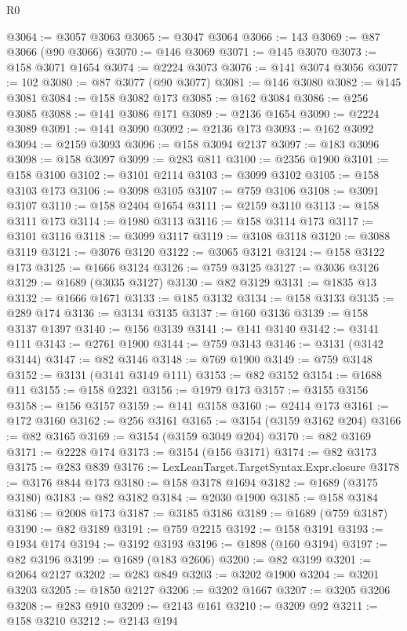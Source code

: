 \begin{lexlean}{R0}
\begin{coremodule}
@3064 := @3057 @3063
@3065 := @3047 @3064
@3066 := 143
@3069 := @87 @3066 (@90 @3066)
@3070 := @146 @3069
@3071 := @145 @3070
@3073 := @158 @3071 @1654
@3074 := @2224 @3073
@3076 := @141 @3074 @3056
@3077 := 102
@3080 := @87 @3077 (@90 @3077)
@3081 := @146 @3080
@3082 := @145 @3081
@3084 := @158 @3082 @173
@3085 := @162 @3084
@3086 := @256 @3085
@3088 := @141 @3086 @171
@3089 := @2136 @1654
@3090 := @2224 @3089
@3091 := @141 @3090
@3092 := @2136 @173
@3093 := @162 @3092
@3094 := @2159 @3093
@3096 := @158 @3094 @2137
@3097 := @183 @3096
@3098 := @158 @3097
@3099 := @283 @811
@3100 := @2356 @1900
@3101 := @158 @3100
@3102 := @3101 @2114
@3103 := @3099 @3102
@3105 := @158 @3103 @173
@3106 := @3098 @3105
@3107 := @759 @3106
@3108 := @3091 @3107
@3110 := @158 @2404 @1654
@3111 := @2159 @3110
@3113 := @158 @3111 @173
@3114 := @1980 @3113
@3116 := @158 @3114 @173
@3117 := @3101 @3116
@3118 := @3099 @3117
@3119 := @3108 @3118
@3120 := @3088 @3119
@3121 := @3076 @3120
@3122 := @3065 @3121
@3124 := @158 @3122 @173
@3125 := @1666 @3124
@3126 := @759 @3125
@3127 := @3036 @3126
@3129 := @1689 (@3035 @3127)
@3130 := @82 @3129
@3131 := @1835 @13
@3132 := @1666 @1671
@3133 := @185 @3132
@3134 := @158 @3133
@3135 := @289 @174
@3136 := @3134 @3135
@3137 := @160 @3136
@3139 := @158 @3137 @1397
@3140 := @156 @3139
@3141 := @141 @3140
@3142 := @3141 @111
@3143 := @2761 @1900
@3144 := @759 @3143
@3146 := @3131 (@3142 @3144)
@3147 := @82 @3146
@3148 := @769 @1900
@3149 := @759 @3148
@3152 := @3131 (@3141 @3149 @111)
@3153 := @82 @3152
@3154 := @1688 @11
@3155 := @158 @2321
@3156 := @1979 @173
@3157 := @3155 @3156
@3158 := @156 @3157
@3159 := @141 @3158
@3160 := @2414 @173
@3161 := @172 @3160
@3162 := @256 @3161
@3165 := @3154 (@3159 @3162 @204)
@3166 := @82 @3165
@3169 := @3154 (@3159 @3049 @204)
@3170 := @82 @3169
@3171 := @2228 @174
@3173 := @3154 (@156 @3171)
@3174 := @82 @3173
@3175 := @283 @839
@3176 := LexLeanTarget.TargetSyntax.Expr.closure
@3178 := @3176 @844 @173
@3180 := @158 @3178 @1694
@3182 := @1689 (@3175 @3180)
@3183 := @82 @3182
@3184 := @2030 @1900
@3185 := @158 @3184
@3186 := @2008 @173
@3187 := @3185 @3186
@3189 := @1689 (@759 @3187)
@3190 := @82 @3189
@3191 := @759 @2215
@3192 := @158 @3191
@3193 := @1934 @174
@3194 := @3192 @3193
@3196 := @1898 (@160 @3194)
@3197 := @82 @3196
@3199 := @1689 (@183 @2606)
@3200 := @82 @3199
@3201 := @2064 @2127
@3202 := @283 @849
@3203 := @3202 @1900
@3204 := @3201 @3203
@3205 := @1850 @2127
@3206 := @3202 @1667
@3207 := @3205 @3206
@3208 := @283 @910
@3209 := @2143 @161
@3210 := @3209 @92
@3211 := @158 @3210
@3212 := @2143 @194

\end{coremodule}
\end{lexlean}
